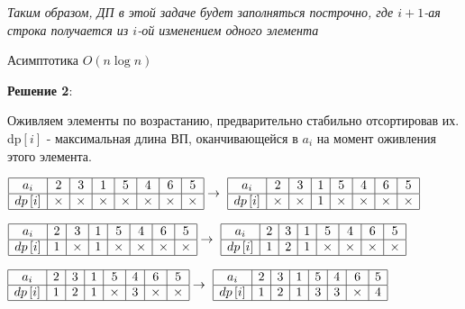 \textit{Таким образом, ДП в этой задаче будет заполняться построчно, где $i+1$-ая строка получается из $i$-ой изменением одного элемента}

Асимптотика $O(n \log{n})$

\textbf{Решение 2}:

Оживляем элементы по возрастанию, предварительно стабильно отсортировав их. dp$\left[i\right]$ - максимальная длина ВП, оканчивающейся в $a_i$ на момент оживления этого элемента.

\text{} 

$\begin{array}{|c|c|c|c|c|c|c|c|}
\hline
     a_i & 2 & 3 & 1 & 5 & 4 & 6 & 5  \\
\hline
     dp\left[i\right] & \times & \times & \times & \times & \times & \times & \times\\
    \hline
\end{array} \to \ \begin{array}{|c|c|c|c|c|c|c|c|}
\hline
     a_i & 2 & 3 & 1 & 5 & 4 & 6 & 5  \\
\hline
     dp\left[i\right] & \times & \times & 1 & \times & \times & \times & \times\\
    \hline
\end{array}$ 

\text{}

$ \begin{array}{|c|c|c|c|c|c|c|c|}
\hline
     a_i & 2 & 3 & 1 & 5 & 4 & 6 & 5  \\
\hline
     dp\left[i\right] & 1 & \times & 1 & \times & \times & \times & \times\\
    \hline
\end{array} \to \ \begin{array}{|c|c|c|c|c|c|c|c|}
\hline
     a_i & 2 & 3 & 1 & 5 & 4 & 6 & 5  \\
\hline
     dp\left[i\right] & 1 & 2 & 1 & \times & \times & \times & \times\\
    \hline
\end{array} $

\text{}

$  \begin{array}{|c|c|c|c|c|c|c|c|}
\hline
     a_i & 2 & 3 & 1 & 5 & 4 & 6 & 5  \\
\hline
     dp\left[i\right] & 1 & 2 & 1 & \times & 3 & \times & \times\\
    \hline
\end{array} \to \ \begin{array}{|c|c|c|c|c|c|c|c|}
\hline
     a_i & 2 & 3 & 1 & 5 & 4 & 6 & 5  \\
\hline
     dp\left[i\right] & 1 & 2 & 1 & 3 & 3 & \times & 4\\
    \hline
\end{array} $


